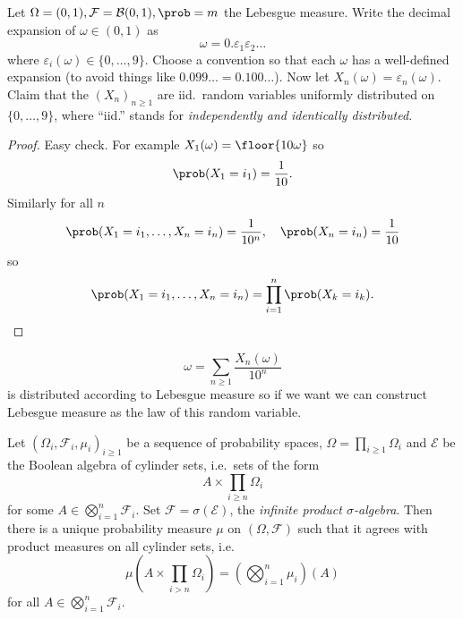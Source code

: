 \documentclass[a4paper]{article}
\renewcommand{\P}{\prob} %
\begin{document}
\begin{eg}
  Let \(\Omega = (0, 1), \mathcal F = \mathcal B(0, 1), \P = m\) the Lebesgue measure. Write the decimal expansion of \(\omega \in (0, 1)\) as
  \[
    \omega = 0. \varepsilon_1 \varepsilon_2 \dots
  \]
  where \(\varepsilon_i(\omega) \in \{0, \dots, 9\}\). Choose a convention so that each \(\omega\) has a well-defined expansion (to avoid things like \(0.099 \dots = 0.100\dots\)). Now let \(X_n(\omega) = \varepsilon_n(\omega)\). Claim that the \((X_n)_{n \geq 1}\) are iid.\ random variables uniformly distributed on \(\{0, \dots, 9\}\), where ``iid.'' stands for \emph{independently and identically distributed}.

  \begin{proof}
    Easy check. For example \(X_1(\omega) = \floor{10 \omega}\) so
    \[
      \P(X_1 = i_1) = \frac{1}{10}.
    \]
    Similarly for all \(n\)
    \[
      \P(X_1 = i_1, \dots, X_n = i_n) = \frac{1}{10^n}, \quad \P(X_n = i_n) = \frac{1}{10}
    \]
    so
    \[
      \P(X_1 = i_1, \dots, X_n = i_n) = \prod_{i = 1}^n \P(X_k = i_k).
    \]
  \end{proof}
\end{eg}

\begin{remark}
  \[
    \omega = \sum_{n \geq 1} \frac{X_n(\omega)}{10^n}
  \]
  is distributed according to Lebesgue measure so if we want we can construct Lebesgue measure as the law of this random variable.
\end{remark}

\begin{proposition}
  Let \((\Omega_i, \mathcal F_i, \mu_i)_{i \geq 1}\) be a sequence of probability spaces, \(\Omega = \prod_{i \geq 1} \Omega_i\) and \(\mathcal E\) be the Boolean algebra of cylinder sets, i.e.\ sets of the form
  \[
    A \times \prod_{i \geq n} \Omega_i
  \]
  for some \(A \in \bigotimes_{i = 1}^n \mathcal F_i\). Set \(\mathcal F = \sigma(\mathcal E)\), the \emph{infinite product \(\sigma\)-algebra}. Then there is a unique probability measure \(\mu\) on \((\Omega, \mathcal F)\) such that it agrees with product measures on all cylinder sets, i.e.
  \[
    \mu(A \times \prod_{i > n} \Omega_i) = (\bigotimes_{i = 1}^n \mu_i)(A)
  \]
  for all \(A \in \bigotimes_{i = 1}^n \mathcal F_i\).
\end{proposition}
\end{document}
